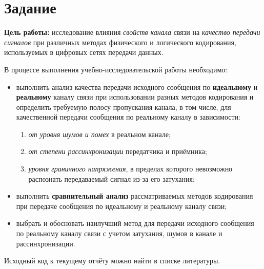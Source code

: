 \section{Задание}

\textbf{Цель работы:} исследование влияния \textit{свойств канала} связи на \textit{качество передачи сигналов} при различных методах физического и логического кодирования, используемых в цифровых сетях передачи данных.

В процессе выполнения учебно-исследовательской работы необходимо:
\begin{itemize}
    \item выполнить анализ качества передачи исходного сообщения по \textbf{идеальному} и \textbf{реальному} каналу связи при использовании разных методов кодирования и определить требуемую полосу пропускания канала, в том числе, для качественной передачи сообщения по реальному каналу в зависимости:
    \begin{enumerate}
        \item \textit{от уровня шумов и помех} в реальном канале;
        \item \textit{от степени рассинхронизации} передатчика и приёмника;
        \item \textit{уровня граничного напряжения}, в пределах которого невозможно распознать передаваемый сигнал из-за его затухания;
    \end{enumerate}
    \item выполнить \textbf{сравнительный анализ} рассматриваемых методов кодирования при передаче сообщения по идеальному и реальному каналу связи;
    \item выбрать и обосновать наилучший метод для передачи исходного сообщения по реальному каналу связи с учетом затухания, шумов в канале и рассинхронизации.
\end{itemize}

Исходный код к текущему отчёту можно найти в списке литературы.\cite{mrdvd2026itmo_labs}